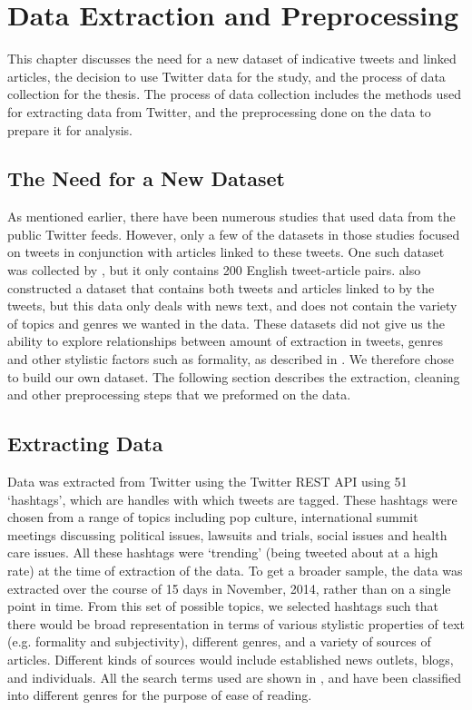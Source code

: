 \chapter{Data Extraction and Preprocessing}
\label{chap:data}

This chapter discusses the need for a new dataset of indicative tweets and linked articles, the decision to use Twitter data for the study, and the process of data collection for the thesis. The process of data collection includes the methods used for extracting data from Twitter, and the preprocessing done on the data to prepare it for analysis. 


\section{The Need for a New Dataset}

As mentioned earlier, there have been numerous studies that used data from the public Twitter feeds. However, only a few of the datasets in those studies focused on tweets in conjunction with articles linked to these tweets. One such dataset was collected by \cite{lloret2013towards}, but it only contains 200 English tweet-article pairs. \cite{wei2014utilizing} also constructed a dataset that contains both tweets and articles linked to by the tweets, but this data only deals with news text, and does not contain the variety of topics and genres we wanted in the data. These datasets did not give us the ability to explore relationships between amount of extraction in tweets, genres and other stylistic factors such as formality, as described in . We therefore chose to build our own dataset. The following section describes the extraction, cleaning and other preprocessing steps that we preformed on the data.

\section{Extracting Data}
\label{sec:extractingdata}



Data was extracted from Twitter using the Twitter REST API using 51 `hashtags', which are handles with which tweets are tagged. These hashtags were chosen from a range of topics including pop culture,  international summit meetings discussing political issues, lawsuits and trials, social issues and health care issues. All these hashtags were `trending' (being tweeted about at a high rate) at the time of extraction of the data. To get a broader sample, the data was extracted over the course of 15 days in November, 2014, rather than on a single point in time. From this set of possible topics, we selected hashtags such that there would be broad representation in terms of various stylistic properties of text (e.g. formality and subjectivity), different genres, and a variety of sources of articles. Different kinds of sources would include established news outlets, blogs, and individuals. All the search terms used are shown in , and have been classified into different genres for the purpose of ease of reading.

